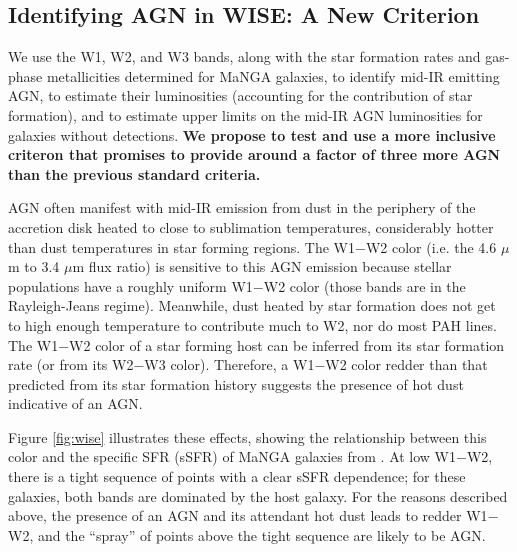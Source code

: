 \documentclass[12pt, preprint]{hacked-aastex}
\begin{document}
\subsection{Identifying AGN in WISE: A New Criterion}
\label{sec:criterion}

We use the W1, W2, and W3 bands, along with the star formation rates
and gas-phase metallicities determined for MaNGA galaxies, to identify
mid-IR emitting AGN, to estimate their luminosities (accounting for
the contribution of star formation), and to estimate upper limits on
the mid-IR AGN luminosities for galaxies without detections. {\bf 
We propose to test and use a more inclusive criteron that promises
to provide around a factor of three more AGN than the previous 
standard criteria.}

AGN often manifest with mid-IR emission from dust in the periphery of
the accretion disk heated to close to sublimation temperatures,
considerably hotter than dust temperatures in star forming regions.
The W1$-$W2 color (i.e. the 4.6 $\mu$m to 3.4 $\mu$m flux ratio) is
sensitive to this AGN emission because stellar populations have a
roughly uniform W1$-$W2 color (those bands are in the
Rayleigh-Jeans regime).  Meanwhile, dust heated by star formation does
not get to high enough temperature to contribute much to W2, nor do
most PAH lines.  The W1$-$W2 color of a star forming host can be
inferred from its star formation rate (or from its W2$-$W3 color).
Therefore, a W1$-$W2 color redder than that predicted from its star
formation history suggests the presence of hot dust indicative of an
AGN.

Figure \ref{fig:wise} illustrates these effects, showing the
relationship between this color and the specific SFR (sSFR) of MaNGA 
galaxies from \cite{sanchez22a}.  At low W1$-$W2, there is a tight sequence
of points with a clear sSFR dependence; for these galaxies, both bands
are dominated by the host galaxy.  For the reasons described above,
the presence of an AGN and its attendant hot dust leads to redder
W1$-$W2, and the ``spray'' of points above the tight sequence are
likely to be AGN. 
\end{document}

